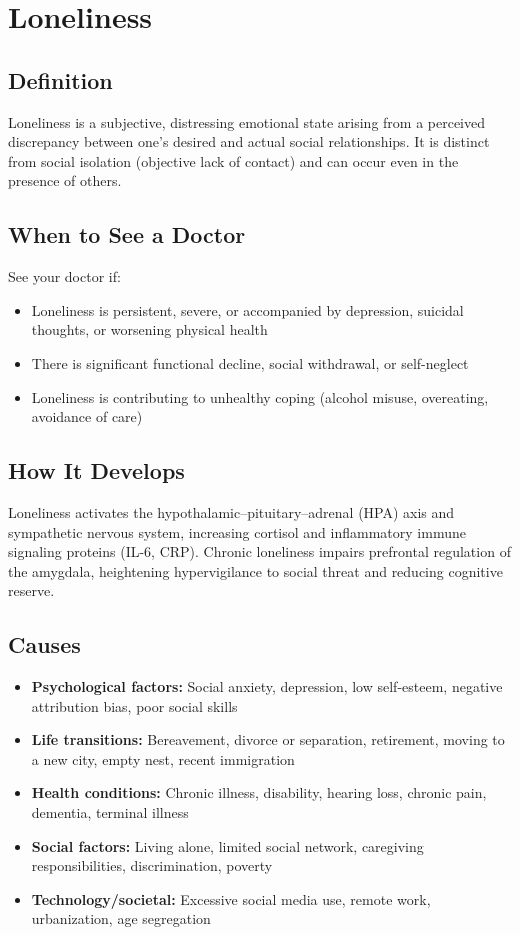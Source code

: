\chapter{Loneliness}

\section*{Definition}
Loneliness is a subjective, distressing emotional state arising from a perceived discrepancy between one's desired and actual social relationships. It is distinct from social isolation (objective lack of contact) and can occur even in the presence of others.

\section*{When to See a Doctor}
See your doctor if:
\begin{itemize}
  \item Loneliness is persistent, severe, or accompanied by depression, suicidal thoughts, or worsening physical health
  \item There is significant functional decline, social withdrawal, or self-neglect
  \item Loneliness is contributing to unhealthy coping (alcohol misuse, overeating, avoidance of care)
\end{itemize}

\section*{How It Develops}
Loneliness activates the hypothalamic--pituitary--adrenal (HPA) axis and sympathetic nervous system, increasing cortisol and inflammatory immune signaling proteins (IL-6, CRP). Chronic loneliness impairs prefrontal regulation of the amygdala, heightening hypervigilance to social threat and reducing cognitive reserve.

\section*{Causes}
\begin{itemize}
  \item \textbf{Psychological factors:} Social anxiety, depression, low self-esteem, negative attribution bias, poor social skills
  \item \textbf{Life transitions:} Bereavement, divorce or separation, retirement, moving to a new city, empty nest, recent immigration
  \item \textbf{Health conditions:} Chronic illness, disability, hearing loss, chronic pain, dementia, terminal illness
  \item \textbf{Social factors:} Living alone, limited social network, caregiving responsibilities, discrimination, poverty
  \item \textbf{Technology/societal:} Excessive social media use, remote work, urbanization, age segregation
\end{itemize}


